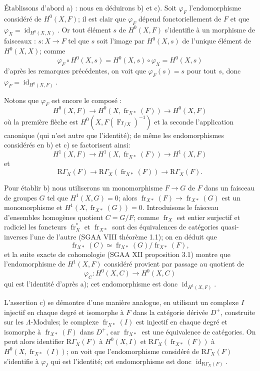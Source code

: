 \documentclass[11pt]{article}
\providecommand{\id}{\operatorname{id}}
\providecommand{\id}{\operatorname{id}}
\providecommand{\id}{\operatorname{id}}
\providecommand{\id}{\operatorname{id}}
\providecommand{\id}{\operatorname{id}}
\providecommand{\fr}{\operatorname{fr}}
\providecommand{\Fr}{\operatorname{Fr}}
\providecommand{\Fr}{\operatorname{Fr}}
\providecommand{\fr}{\operatorname{fr}}
\providecommand{\id}{\operatorname{id}}
\begin{document}
Établissons d'abord a) : nous en déduirons b) et c). Soit $\varphi_F$ l'endomorphisme considéré de $H^0(X,F)$; il est clair que $\varphi_F$ dépend fonctoriellement de $F$ et que $\varphi_X=\id_{H^0(X,X)}$. Or tout élément $s$ de $H^0(X,F)$ s'identifie à un morphisme de faisceaux : $s:X\to F$ tel que $s$ soit l'image par $H^0(X,s)$ de l'unique élément de $H^0(X,X)$; comme
\[
\varphi_F\circ H^0(X,s)=H^0(X,s)\circ\varphi_X=H^0(X,s)
\]
d'après les remarques précédentes, on voit que $\varphi_F(s)=s$ pour tout $s$, donc $\varphi_F=\id_{H^0(X,F)}$.

Notons que $\varphi_F$ est encore le composé :
\[
H^0(X,F)\longrightarrow H^0(X,\fr_{X*}(F))
\longrightarrow H^0(X,F)
\]
où la première flèche est $H^0(X,F(\Fr_{/X})^{-1})$ et la seconde l'application canonique (qui n'est autre que l'identité); de même les endomorphismes considérés en b) et c) se factorisent ainsi:
\[
H^1(X,F)\longrightarrow H^1(X,\fr_{X*}(F))
\longrightarrow H^1(X,F)
\]
et
\[
\mathrm{R}\Gamma_X(F)\longrightarrow \mathrm{R}\Gamma_X(\fr_{X*}(F))
\longrightarrow \mathrm{R}\Gamma_X(F).
\]

Pour établir b) nous utiliserons un monomorphisme $F\to G$ de $F$ dans un faisceau de groupes $G$ tel que $H^1(X,G)=0$; alors $\fr_{X*}(F)\to\fr_{X*}(G)$ est un monomorphisme et $H^1(X,\fr_{X*}(G))=0$. Introduisons le faisceau d'ensembles homogènes quotient $C=G/F$;
comme $\fr_X$ est entier surjectif et radiciel les foncteurs $\fr_X^*$ et $\fr_{X*}$ sont des équivalences de catégories quasi-inverses l'une de l'autre (SGAA VIII théorème 1.1); on en déduit que
\[
\fr_{X*}(C)\simeq\fr_{X*}(G)/\fr_{X*}(F),
\]
et la suite exacte de cohomologie (SGAA XII proposition 3.1) montre que l'endomorphisme de $H^1(X,F)$ considéré provient par passage au quotient de
\[
\varphi_C:H^0(X,C)\longrightarrow H^0(X,C)
\]
qui est l'identité d'après a); cet endomorphisme est donc $\id_{H^1(X,F)}$.

L'assertion c) se démontre d'une manière analogue, en utilisant un complexe $I$ injectif en chaque degré et isomorphe à $F$ dans la catégorie dérivée $D^+$, construite sur les $\Lambda$-Modules; le complexe $\fr_{X*}(I)$ est injectif en chaque degré et isomorphe à $\fr_{X*}(F)$ dans $D^+$, car $\fr_{X*}$ est une équivalence de catégories. On peut alors identifier $\mathrm{R}\Gamma_X(F)$ à $H^0(X,I)$ et $\mathrm{R}\Gamma_X(\fr_{X*}(F))$ à $H^0(X,\fr_{X*}(I))$; on voit que l'endomorphisme considéré de $\mathrm{R}\Gamma_X(F)$ s'identifie à $\varphi_I$ qui est l'identité; cet endomorphisme est donc $\id_{\mathrm{R}\Gamma_X(F)}$.
\end{document}

